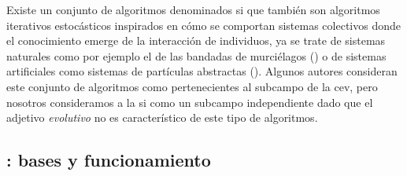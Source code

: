 Existe un conjunto de algoritmos denominados \gls{si} que también son algoritmos iterativos estocásticos inspirados en cómo se comportan sistemas colectivos donde el conocimiento emerge de la interacción de individuos, ya se trate de sistemas naturales como por ejemplo el de las bandadas de murciélagos (\cite{Yang2010}) o de sistemas artificiales como sistemas de partículas abstractas (\cite{Artyukhin2014}). Algunos autores consideran este conjunto de algoritmos como pertenecientes al subcampo de la \gls{cev}, pero nosotros consideramos a la \gls{si} como un subcampo independiente dado que el adjetivo \textit{evolutivo} no es característico de este tipo de algoritmos.

\subsection{: bases y funcionamiento}

